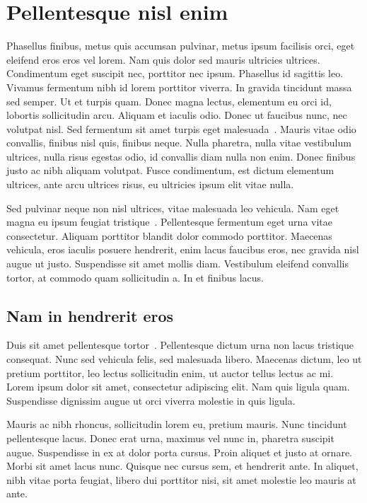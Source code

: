 \chapter{Pellentesque nisl enim}
Phasellus finibus, metus quis accumsan pulvinar, metus ipsum facilisis orci, eget eleifend eros eros vel lorem. Nam quis dolor sed mauris ultricies ultrices. Condimentum eget suscipit nec, porttitor nec ipsum. Phasellus id sagittis leo. Vivamus fermentum nibh id lorem porttitor viverra. In gravida tincidunt massa sed semper. Ut et turpis quam. Donec magna lectus, elementum eu orci id, lobortis sollicitudin arcu. Aliquam et iaculis odio. Donec ut faucibus nunc, nec volutpat nisl. Sed fermentum sit amet turpis eget malesuada~\cite{Vorontsov_PI}. Mauris vitae odio convallis, finibus nisl quis, finibus neque. Nulla pharetra, nulla vitae vestibulum ultrices, nulla risus egestas odio, id convallis diam nulla non enim. Donec finibus justo ac nibh aliquam volutpat. Fusce condimentum, est dictum elementum ultrices, ante arcu ultrices risus, eu ultricies ipsum elit vitae nulla.

Sed pulvinar neque non nisl ultrices, vitae malesuada leo vehicula. Nam eget magna eu ipsum feugiat tristique~\cite{PMTYMM}. Pellentesque fermentum eget urna vitae consectetur. Aliquam porttitor blandit dolor commodo porttitor. Maecenas vehicula, eros iaculis posuere hendrerit, enim lacus faucibus eros, nec gravida nisl augue ut justo. Suspendisse sit amet mollis diam. Vestibulum eleifend convallis tortor, at commodo quam sollicitudin a. In et finibus lacus.

\section{Nam in hendrerit eros}
Duis sit amet pellentesque tortor~\cite{Orlovskiy}. Pellentesque dictum urna non lacus tristique consequat. Nunc sed vehicula felis, sed malesuada libero. Maecenas dictum, leo ut pretium porttitor, leo lectus sollicitudin enim, ut auctor tellus lectus ac mi. Lorem ipsum dolor sit amet, consectetur adipiscing elit. Nam quis ligula quam. Suspendisse dignissim augue ut orci viverra molestie in quis ligula. 

Mauris ac nibh rhoncus, sollicitudin lorem eu, pretium mauris. Nunc tincidunt pellentesque lacus. Donec erat urna, maximus vel nunc in, pharetra suscipit augue. Suspendisse in ex at dolor porta cursus. Proin aliquet et justo at ornare. Morbi sit amet lacus nunc. Quisque nec cursus sem, et hendrerit ante. In aliquet, nibh vitae porta feugiat, libero dui porttitor nisi, sit amet molestie leo mauris at ante.
